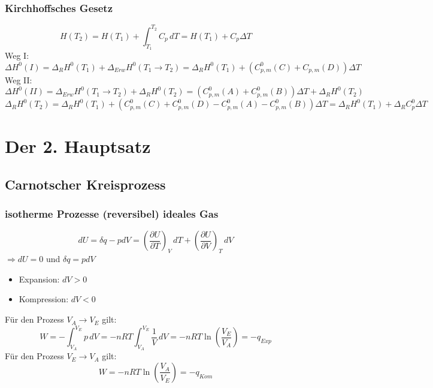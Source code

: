 \documentclass[a4paper, fleqn]{article}
\begin{document}
\subsubsection{Kirchhoffsches Gesetz}
\begin{equation*}
    H(T_2) = H(T_1) + \int_{T_1}^{T_2} C_p \, dT = H(T_1)+C_p \Delta T
\end{equation*}
Weg I:
\begin{equation*}
    \Delta H^0 (I) = \Delta_RH^0 (T_1) + \Delta_{Erw} H^0 (T_1 \rightarrow T_2) = \Delta_RH^0(T_1) + (C_{p,m}^0(C) + C_{p,m}(D)) \Delta T
\end{equation*}
Weg II:
\begin{equation*}
    \Delta H^0 (II) = \Delta_{Erw} H^0 (T_1 \rightarrow T_2) + \Delta_RH^0 (T_2) = (C_{p,m}^0 (A) + C_{p,m}^0 (B))\Delta T + \Delta_RH^0 (T_2)
\end{equation*}
\begin{equation*}
    \Delta_RH^0 (T_2) = \Delta_RH^0 (T_1) + (C_{p,m}^0 (C)+C_{p,m}^0 (D)-C_{p,m}^0(A)-C_{p,m}^0(B)) \Delta T = \Delta_RH^0 (T_1) + \Delta_RC_p^0 \Delta T
\end{equation*}

\section{Der 2. Hauptsatz}
\subsection{Carnotscher Kreisprozess}
\subsubsection{isotherme Prozesse (reversibel) ideales Gas}
\begin{equation*}
    dU = \delta q - pdV = \left(\frac{\partial U}{\partial T}\right)_V \, dT + \left(\frac{\partial U}{\partial V}\right)_T \, dV
\end{equation*}
$\Rightarrow dU = 0$ und $\delta q = pdV$\\
\begin{itemize}
    \item[] Expansion: $dV>0$
    \item[] Kompression: $dV<0$
\end{itemize}
Für den Prozess $V_A \rightarrow V_E$ gilt:
\begin{equation*}
    W = - \int_{V_A}^{V_E} p \, dV = -nRT \int_{V_A}^{V_E} \frac{1}{V} \, dV = -nRT \ln\left(\frac{V_E}{V_A}\right) = -q_{Exp}
\end{equation*}
Für den Prozess $V_E \rightarrow V_A$ gilt:
\begin{equation*}
    W = -nRT \ln\left(\frac{V_A}{V_E}\right)=-q_{Kom}
\end{equation*}
\end{document}
